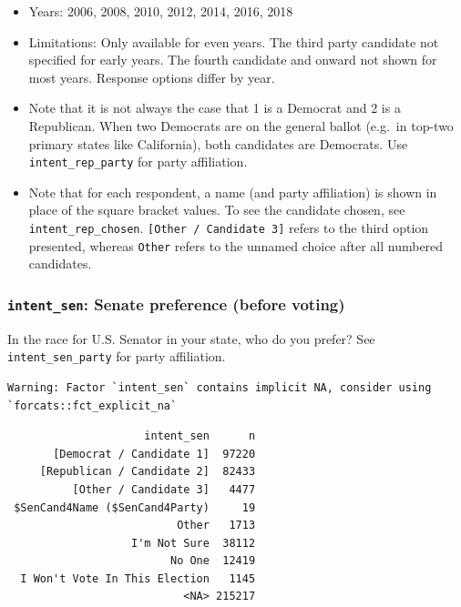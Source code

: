 \documentclass[10pt,article,oneside]{memoir}
\theoremstyle{definition}
\begin{document}
\begin{itemize}
\tightlist
\item
  Years: 2006, 2008, 2010, 2012, 2014, 2016, 2018
\item
  Limitations: Only available for even years. The third party candidate
  not specified for early years. The fourth candidate and onward not
  shown for most years. Response options differ by year.
\item
  Note that it is not always the case that 1 is a Democrat and 2 is a
  Republican. When two Democrats are on the general ballot (e.g.~in
  top-two primary states like California), both candidates are
  Democrats. Use \texttt{intent\_rep\_party} for party affiliation.
\item
  Note that for each respondent, a name (and party affiliation) is shown
  in place of the square bracket values. To see the candidate chosen,
  see \texttt{intent\_rep\_chosen}.
  \texttt{{[}Other\ /\ Candidate\ 3{]}} refers to the third option
  presented, whereas \texttt{Other} refers to the unnamed choice after
  all numbered candidates.
\end{itemize}

\hypertarget{intent_sen-senate-preference-before-voting}{%
\subsubsection{\texorpdfstring{\texttt{intent\_sen}: Senate preference
(before
voting)}{intent\_sen: Senate preference (before voting)}}\label{intent_sen-senate-preference-before-voting}}

In the race for U.S. Senator in your state, who do you prefer? See
\texttt{intent\_sen\_party} for party affiliation.

\begin{verbatim}
Warning: Factor `intent_sen` contains implicit NA, consider using
`forcats::fct_explicit_na`
\end{verbatim}

\begin{verbatim}
                     intent_sen      n
       [Democrat / Candidate 1]  97220
     [Republican / Candidate 2]  82433
          [Other / Candidate 3]   4477
 $SenCand4Name ($SenCand4Party)     19
                          Other   1713
                   I'm Not Sure  38112
                         No One  12419
  I Won't Vote In This Election   1145
                           <NA> 215217
\end{verbatim}
\end{document}
